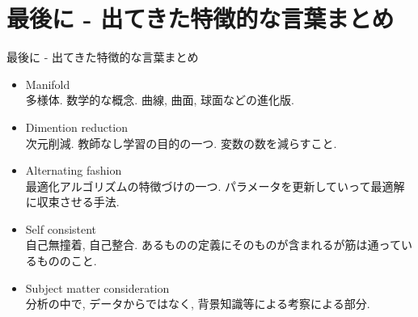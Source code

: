 \documentclass[dvipdfmx,8pt]{beamer}
\begin{document}
  \section{最後に - 出てきた特徴的な言葉まとめ}
  \begin{frame}{最後に - 出てきた特徴的な言葉まとめ}
    \begin{itemize}
      \item Manifold\\
        多様体. 数学的な概念. 曲線, 曲面, 球面などの進化版.
      \item Dimention reduction\\
        次元削減. 教師なし学習の目的の一つ. 変数の数を減らすこと.
      \item Alternating fashion\\
        最適化アルゴリズムの特徴づけの一つ. パラメータを更新していって最適解に収束させる手法.
      \item Self consistent\\
        自己無撞着, 自己整合. あるものの定義にそのものが含まれるが筋は通っているもののこと.
      \item Subject matter consideration\\
        分析の中で, データからではなく, 背景知識等による考察による部分.
    \end{itemize}
  \end{frame}
\end{document}
